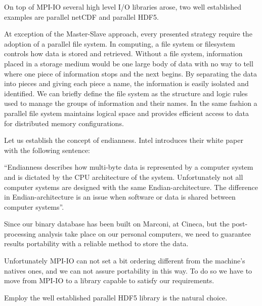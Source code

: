 On top of MPI-IO several high level I/O libraries arose, two well established examples are parallel netCDF and parallel HDF5. 

At exception of the Master-Slave approach, every presented strategy require the adoption of a parallel file system.
In computing, a file system or filesystem controls how data is stored and retrieved. Without a file system, information placed in a storage medium would be one large body of data with no way to tell where one piece of information stops and the next begins. By separating the data into pieces and giving each piece a name, the information is easily isolated and identified. We can briefly define the file system as the structure and logic rules used to manage the groups of information and their names.
In the same fashion a parallel file system maintains logical space and provides efficient access to data for distributed memory configurations.\\
\par
Let us establish the concept of endianness.
Intel introduces their white paper with the following sentence:\par
``Endianness describes how multi-byte data is represented by a computer system and is dictated by the CPU architecture of the system. Unfortunately not all computer systems are designed with the same Endian-architecture. The difference in Endian-architecture is an issue when software or data is shared between computer systems''\cite{endianness}.\par
Since our binary database has been built on Marconi, at Cineca, but the post-processing analysis take place on our personal computers, we need to guarantee results portability with a reliable method to store the data. \\
\par
Unfortunately MPI-IO can not set a bit ordering different from the machine's natives ones, and we can not assure portability in this way. To do so we have to move from MPI-IO to a library capable to satisfy our requirements.\par
Employ the well established parallel HDF5 library is the natural choice.



